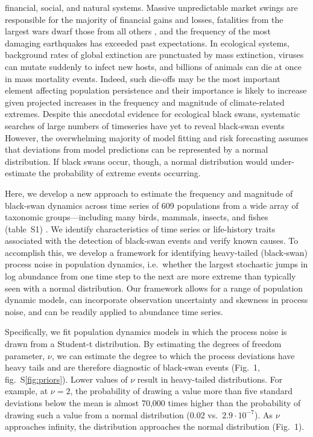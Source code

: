 financial, social, and natural systems\cite{taleb2007, sornette2009, may2008}.
Massive unpredictable market swings are responsible for the majority of
financial gains and losses\cite{taleb2007}, fatalities from the largest wars
dwarf those from all others \cite{newman2005}, and the frequency of the most
damaging earthquakes has exceeded past expectations\cite{sornette2009}. In
ecological systems, background rates of global extinction are punctuated by
mass extinction\cite{harnik2012}, viruses can mutate suddenly to infect new
hosts, and billions of animals can die at once in mass mortality
events\cite{fey2015}. Indeed, such die-offs may be the most important element
affecting population persistence\cite{mangel1994} and their importance is
likely to increase given projected increases in the frequency and magnitude of
climate-related extremes\cite{ipcc2012}. Despite this anecdotal evidence for
ecological black swans, systematic searches of large numbers of timeseries have
yet to reveal black-swan events\cite{keitt1998, allen2001, halley2002} However,
the overwhelming majority of model fitting and risk forecasting assumes that
deviations from model predictions can be represented by a normal
distribution\cite{brook2006a, knape2012}. If black swans occur, though,
a normal distribution would under-estimate the probability of extreme events
occurring.

Here, we develop a new approach to estimate the frequency and magnitude of
black-swan dynamics across time series of 609 populations from a wide array of
taxonomic groups---including many  birds, mammals, insects, and fishes
(table~S1) \cite{SOM}. We identify characteristics of time series or
life-history traits associated with the detection of black-swan events and
verify known causes. To accomplish this, we develop a framework for identifying
heavy-tailed (black-swan) process noise in population dynamics, i.e.~whether
the largest stochastic jumps in log abundance from one time step to the next
are more extreme than typically seen with a normal distribution. Our framework
allows for a range of population dynamic models, can incorporate observation
uncertainty and skewness in process noise, and can be readily applied to
abundance time series.

Specifically, we fit population dynamics models in which the process noise is
drawn from a Student-t distribution. By estimating the degrees of freedom
parameter, \(\nu\), we can estimate the degree to which the process deviations
have heavy tails and are therefore diagnostic of black-swan events (Fig.~1,
fig.~S\ref{fig:priors}). Lower values of \(\nu\) result in heavy-tailed
distributions. For example, at \(\nu = 2\), the probability of drawing a value
more than five standard deviations below the mean is almost 70,000 times higher
than the probability of drawing such a value from a normal distribution
(\(0.02\) vs.\ \(2.9\cdot10^{-7}\)). As \(\nu\) approaches infinity, the
distribution approaches the normal distribution (Fig.~1).

